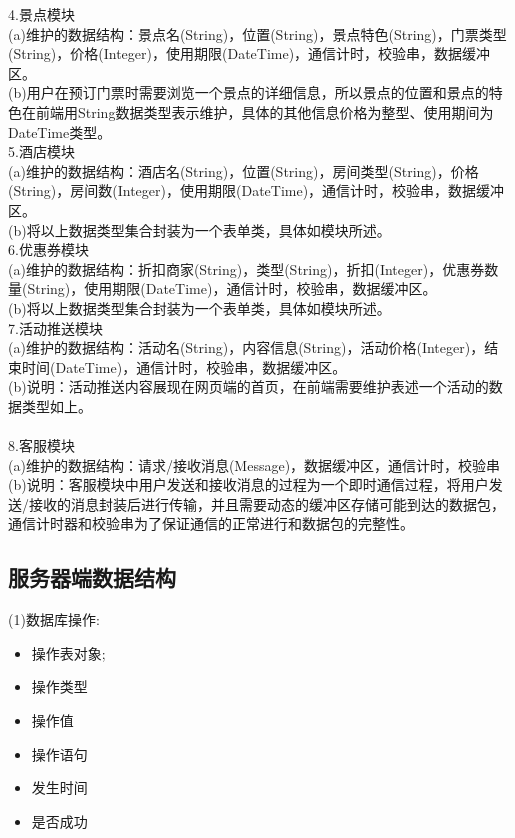 \indent    4.景点模块 \\
\indent    (a)维护的数据结构：景点名(String)，位置(String)，景点特色(String)，门票类型(String)，价格(Integer)，使用期限(DateTime)，通信计时，校验串，数据缓冲区。\\
\indent    (b)用户在预订门票时需要浏览一个景点的详细信息，所以景点的位置和景点的特色在前端用String数据类型表示维护，具体的其他信息价格为整型、使用期间为DateTime类型。
\\

\indent    5.酒店模块 \\
\indent    (a)维护的数据结构：酒店名(String)，位置(String)，房间类型(String)，价格(String)，房间数(Integer)，使用期限(DateTime)，通信计时，校验串，数据缓冲区。\\
\indent    (b)将以上数据类型集合封装为一个表单类，具体如模块所述。
\\

\indent    6.优惠券模块 \\
\indent    (a)维护的数据结构：折扣商家(String)，类型(String)，折扣(Integer)，优惠券数量(String)，使用期限(DateTime)，通信计时，校验串，数据缓冲区。\\
\indent    (b)将以上数据类型集合封装为一个表单类，具体如模块所述。
\\

\indent    7.活动推送模块 \\
\indent    (a)维护的数据结构：活动名(String)，内容信息(String)，活动价格(Integer)，结束时间(DateTime)，通信计时，校验串，数据缓冲区。 \\
\indent    (b)说明：活动推送内容展现在网页端的首页，在前端需要维护表述一个活动的数据类型如上。
\\ \\

\indent    8.客服模块 \\
\indent    (a)维护的数据结构：请求/接收消息(Message)，数据缓冲区，通信计时，校验串 \\
\indent    (b)说明：客服模块中用户发送和接收消息的过程为一个即时通信过程，将用户发送/接收的消息封装后进行传输，并且需要动态的缓冲区存储可能到达的数据包，通信计时器和校验串为了保证通信的正常进行和数据包的完整性。
\\

\subsection{服务器端数据结构}


(1)数据库操作:
\begin{itemize}
    \item 操作表对象;
    \item 操作类型
    \item 操作值
    \item 操作语句
    \item 发生时间
    \item 是否成功
\end{itemize}


